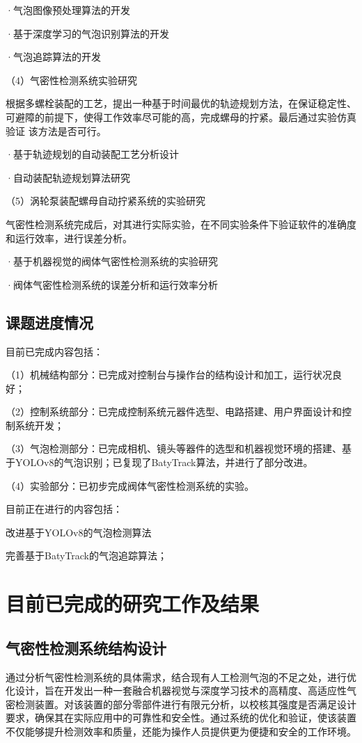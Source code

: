 ·气泡图像预处理算法的开发

·基于深度学习的气泡识别算法的开发

·气泡追踪算法的开发

（4）气密性检测系统实验研究

根据多螺栓装配的工艺，提出一种基于时间最优的轨迹规划方法，在保证稳定性、 可避障的前提下，使得工作效率尽可能的高，完成螺母的拧紧。最后通过实验仿真验证 该方法是否可行。

·基于轨迹规划的自动装配工艺分析设计

·自动装配轨迹规划算法研究

（5）涡轮泵装配螺母自动拧紧系统的实验研究

气密性检测系统完成后，对其进行实际实验，在不同实验条件下验证软件的准确度和运行效率，进行误差分析。

·基于机器视觉的阀体气密性检测系统的实验研究

·阀体气密性检测系统的误差分析和运行效率分析

\subsection{课题进度情况}

目前已完成内容包括：

（1）机械结构部分：已完成对控制台与操作台的结构设计和加工，运行状况良好；

（2）控制系统部分：已完成控制系统元器件选型、电路搭建、用户界面设计和控制系统开发；

（3）气泡检测部分：已完成相机、镜头等器件的选型和机器视觉环境的搭建、基于YOLOv8的气泡识别；已复现了BatyTrack算法，并进行了部分改进。

（4）实验部分：已初步完成阀体气密性检测系统的实验。

目前正在进行的内容包括：

改进基于YOLOv8的气泡检测算法

完善基于BatyTrack的气泡追踪算法；

\section{目前已完成的研究工作及结果}

\subsection{气密性检测系统结构设计}

通过分析气密性检测系统的具体需求，结合现有人工检测气泡的不足之处，进行优化设计，旨在开发出一种一套融合机器视觉与深度学习技术的高精度、高适应性气密检测装置。对该装置的部分零部件进行有限元分析，以校核其强度是否满足设计要求，确保其在实际应用中的可靠性和安全性。通过系统的优化和验证，使该装置不仅能够提升检测效率和质量，还能为操作人员提供更为便捷和安全的工作环境。


